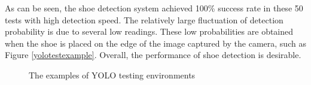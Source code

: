 \begin{table}[H]
\centering
{}
\caption{The testing results of YOLO shoe detection}
\label{yolotest}
\end{table}

As can be seen, the shoe detection system achieved 100\% success rate in these 50 tests with high detection speed. The relatively large fluctuation of detection probability is due to several low readings. These low probabilities are obtained when the shoe is placed on the edge of the image captured by the camera, such as Figure \ref{yolotestexample}. Overall, the performance of shoe detection is desirable. 

\begin{figure}[H]
\centering
{}
\caption{The examples of YOLO testing environments}
\end{figure}

